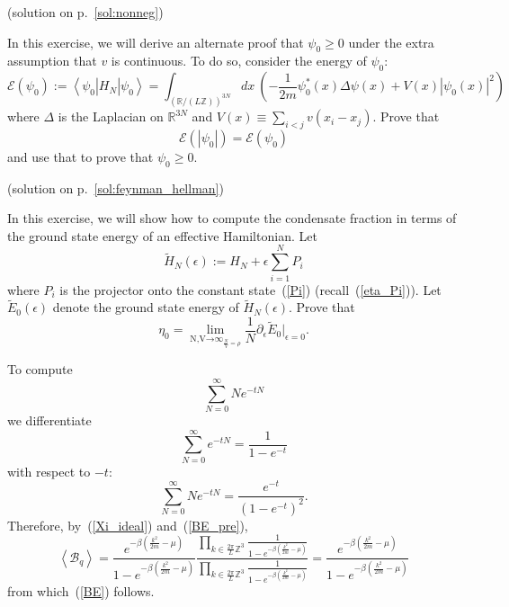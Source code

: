 \documentclass{ian}
\begin{document}
\problem\label{ex:nonneg} (solution on p.\-~\ref{sol:nonneg})\par
\smallskip
In this exercise, we will derive an alternate proof that $\psi_0\geqslant 0$ under the extra assumption that $v$ is continuous.
To do so, consider the energy of $\psi_0$:
\begin{equation}
  \mathcal E(\psi_0):=\left<\psi_0\right|H_N\left|\psi_0\right>
  =\int_{(\mathbb R/(L\mathbb Z))^{3N}} dx\ 
  \left(
    -\frac1{2m}\psi_0^*(x)\Delta\psi(x)
    +V(x)|\psi_0(x)|^2
  \right)
\end{equation}
where $\Delta$ is the Laplacian on $\mathbb R^{3N}$ and $V(x)\equiv\sum_{i<j}v(x_i-x_j)$.
Prove that
\begin{equation}
  \mathcal E(|\psi_0|)=\mathcal E(\psi_0)
\end{equation}
and use that to prove that $\psi_0\geqslant 0$.
\bigskip

\problem\label{ex:feynman_hellman} (solution on p.\-~\ref{sol:feynman_hellman})\par
\smallskip
In this exercise, we will show how to compute the condensate fraction in terms of the ground state energy of an effective Hamiltonian.
Let
\begin{equation}
  \tilde H_N(\epsilon):=
  H_N+\epsilon\sum_{i=1}^NP_i
\end{equation}
where $P_i$ is the projector onto the constant state\-~(\ref{Pi}) (recall\-~(\ref{eta_Pi})).
Let $\tilde E_0(\epsilon)$ denote the ground state energy of $\tilde H_N(\epsilon)$.
Prove that
\begin{equation}
  \eta_0=
  \lim_{\displaystyle\mathop{\scriptstyle N,V\to\infty}_{\frac NV=\rho}}
  \frac1N
  \partial_\epsilon\tilde E_0|_{\epsilon=0}
  .
\end{equation}

\vfill
\eject

To compute
\begin{equation}
  \sum_{N=0}^\infty Ne^{-tN}
\end{equation}
we differentiate
\begin{equation}
  \sum_{N=0}^\infty e^{-tN}
  =\frac1{1-e^{-t}}
\end{equation}
with respect to $-t$:
\begin{equation}
  \sum_{N=0}^\infty Ne^{-tN}
  =\frac{e^{-t}}{(1-e^{-t})^2}
  .
\end{equation}
Therefore, by\-~(\ref{Xi_ideal}) and\-~(\ref{BE_pre}),
\begin{equation}
  \left<\mathcal B_q\right>=
  \frac{e^{-\beta(\frac{k^2}{2m}-\mu)}}{1-e^{-\beta(\frac{k^2}{2m}-\mu)}}
  \frac{
    \prod_{k\in\frac{2\pi}L\mathbb Z^3}
    \frac1{1-e^{-\beta(\frac{k^2}{2m}-\mu)}}
  }
    {\prod_{k\in\frac{2\pi}L\mathbb Z^3}
    \frac1{1-e^{-\beta(\frac{k^2}{2m}-\mu)}}
  }
  =
  \frac{e^{-\beta(\frac{k^2}{2m}-\mu)}}{1-e^{-\beta(\frac{k^2}{2m}-\mu)}}
\end{equation}
from which\-~(\ref{BE}) follows.
\bigskip
\end{document}
